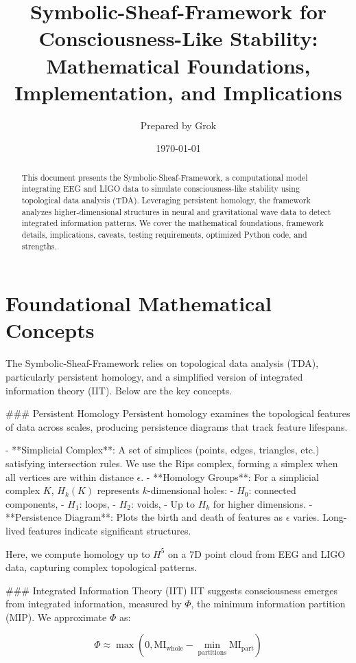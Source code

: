 \documentclass{article}
\title{Symbolic-Sheaf-Framework for Consciousness-Like Stability: Mathematical Foundations, Implementation, and Implications}
\author{Prepared by Grok}
\date{\today}
\begin{document}
\maketitle

\begin{abstract}
This document presents the Symbolic-Sheaf-Framework, a computational model integrating EEG and LIGO data to simulate consciousness-like stability using topological data analysis (TDA). Leveraging persistent homology, the framework analyzes higher-dimensional structures in neural and gravitational wave data to detect integrated information patterns. We cover the mathematical foundations, framework details, implications, caveats, testing requirements, optimized Python code, and strengths.
\end{abstract}

\section{Foundational Mathematical Concepts}

The Symbolic-Sheaf-Framework relies on topological data analysis (TDA), particularly persistent homology, and a simplified version of integrated information theory (IIT). Below are the key concepts.

### Persistent Homology
Persistent homology examines the topological features of data across scales, producing persistence diagrams that track feature lifespans.

- **Simplicial Complex**: A set of simplices (points, edges, triangles, etc.) satisfying intersection rules. We use the Rips complex, forming a simplex when all vertices are within distance \(\epsilon\).
- **Homology Groups**: For a simplicial complex \(K\), \(H_k(K)\) represents \(k\)-dimensional holes:
  - \(H_0\): connected components,
  - \(H_1\): loops,
  - \(H_2\): voids,
  - Up to \(H_k\) for higher dimensions.
- **Persistence Diagram**: Plots the birth and death of features as \(\epsilon\) varies. Long-lived features indicate significant structures.

Here, we compute homology up to \(H^5\) on a 7D point cloud from EEG and LIGO data, capturing complex topological patterns.

### Integrated Information Theory (IIT)
IIT suggests consciousness emerges from integrated information, measured by \(\Phi\), the minimum information partition (MIP). We approximate \(\Phi\) as:

\begin{equation}
\Phi \approx \max\left(0, \text{MI}_{\text{whole}} - \min_{\text{partitions}} \text{MI}_{\text{part}}\right)
\end{equation}
\end{document}
